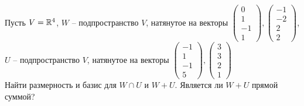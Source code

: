 Пусть $ V = \mathbb{R}^4 $, $ W $ -- подпространство $ V $, натянутое на векторы $
\begin{pmatrix}
	0 \\
    1 \\
    -1 \\
    1
\end{pmatrix},
\begin{pmatrix}
	-1 \\
    -2 \\
    2 \\
    2
\end{pmatrix} $, $ U $ -- подпространство $ V $, натянутое на векторы $
\begin{pmatrix}
	-1 \\
    1 \\
    -1 \\
    5
\end{pmatrix},
\begin{pmatrix}
	3 \\
    3 \\
    2 \\
    1
\end{pmatrix} $ \\
Найти размерность и базис для $ W \cap U $ и $ W + U $. Является ли $ W + U $ прямой суммой?

